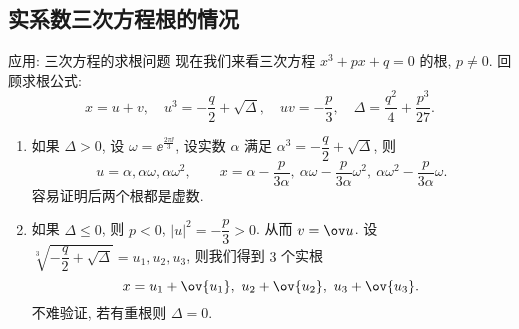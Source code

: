 \subsection{实系数三次方程根的情况}


\begin{frame}{应用: 三次方程的求根问题\noexer}
	\onslide<+->
	现在我们来看三次方程 $x^3+px+q=0$ 的根, $p\neq 0$.
	\onslide<+->
	回顾求根公式:
	\[
		x=u+v,\quad
		u^3=-\frac q2+\sqrt{\Delta},\quad
		uv=-\frac p3,\quad
		\Delta=\frac{q^2}4+\frac{p^3}{27}.
	\]
	\vspace{-\baselineskip}
	\begin{enumerate}
		\item 如果 $\Delta>0$, 设 $\omega=\ee^{\frac{2\pi\ii}3}$, 设实数 $\alpha$ 满足 $\alpha^3=-\dfrac q2+\sqrt{\Delta}$,
		\onslide<+->
		则
		\[
			u=\alpha,\alpha\omega,\alpha\omega^2,\qquad
			x=\alpha-\frac p{3\alpha},\ 
				\alpha\omega-\frac p{3\alpha} \omega^2,\ 
				\alpha\omega^2-\frac p{3\alpha} \omega.
		\]
		\onslide<+->
		容易证明后两个根都是虚数.
		\item 如果 $\Delta\le 0$, 则 $p<0$, $|u|^2=-\dfrac p3>0$. 
		\onslide<+->
		从而 $v=\ov u$.
		\onslide<+->
		设 $\sqrt[3]{-\dfrac q2+\sqrt{\Delta}}=u_1,u_2,u_3$,
		\onslide<+->
		则我们得到 $3$ 个实根
		\[
			x=u_1+\ov{u_1},\ u_2+\ov{u_2},\ u_3+\ov{u_3}.
		\]
		\onslide<+->
		不难验证, 若有重根则 $\Delta=0$.
	\end{enumerate}
\end{frame}

